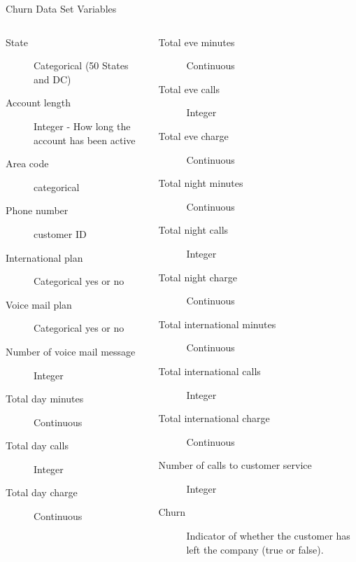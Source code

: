 \documentclass[handout]{beamer}
\begin{document}
\begin{frame}[t]{Churn Data Set Variables}
\begin{columns}
   {\scriptsize
   \begin{description}
     \item[State] Categorical (50 States and DC)
     \item[Account length] Integer - How long the account has been active
     \item[Area code] categorical
     \item[Phone number] customer ID
     \item[International plan] Categorical yes or no
     \item[Voice mail plan] Categorical yes or no
     \item[Number of voice mail message] Integer
     \item[Total day minutes] Continuous
     \item[Total day calls] Integer
     \item[Total day charge] Continuous
   \end{description}
   }
   {\scriptsize
   \begin{description}
     \item[Total eve minutes] Continuous
     \item[Total eve calls] Integer
     \item[Total eve charge] Continuous
     \item[Total night minutes] Continuous
     \item[Total night calls] Integer
     \item[Total night charge] Continuous
     \item[Total international minutes] Continuous
     \item[Total international calls] Integer
     \item[Total international charge] Continuous
     \item[Number of calls to customer service] Integer
     \item[Churn] Indicator of whether the customer has left the company (true or false).
  \end{description}
  }
\end{columns}
\end{frame}
\end{document}
